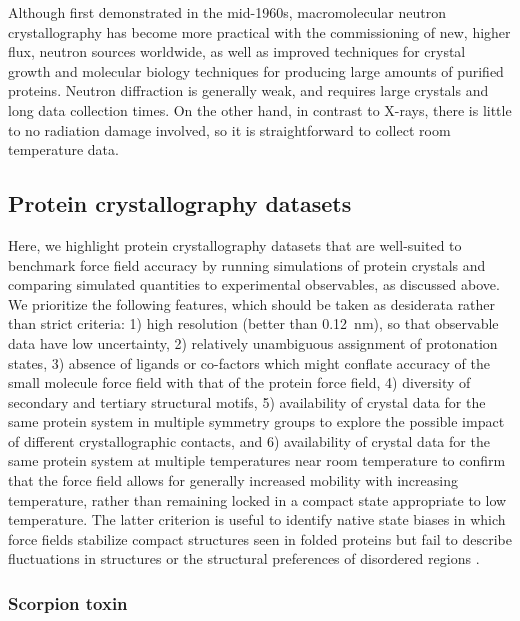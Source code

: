 \documentclass[9pt,review]{livecoms}
\begin{document}
Although first demonstrated in the mid-1960s, macromolecular neutron crystallography has become more practical with the commissioning of new, higher flux, neutron sources worldwide, as well as improved techniques for crystal growth and molecular biology techniques for producing large amounts of purified proteins.
Neutron diffraction is generally weak, and requires large crystals and long data collection times.
On the other hand, in contrast to X-rays, there is little to no radiation damage involved, so it is straightforward to collect room temperature data.

\subsection{Protein crystallography datasets}
\label{sub:xtal_data}

Here, we highlight protein crystallography datasets that are well-suited to benchmark force field accuracy by running simulations of protein crystals and comparing simulated quantities to experimental observables, as discussed above.
We prioritize the following features, which should be taken as desiderata rather than strict criteria: 1) high resolution (better than \qty{0.12}{\nano\meter}), so that observable data have low uncertainty, 2) relatively unambiguous assignment of protonation states, 3) absence of ligands or co-factors which might conflate accuracy of the small molecule force field with that of the protein force field, 4) diversity of secondary and tertiary structural motifs, 5) availability of crystal data for the same protein system in multiple symmetry groups to explore the possible impact of different crystallographic contacts, and 6) availability of crystal data for the same protein system at multiple temperatures near room temperature to confirm that the force field allows for generally increased mobility with increasing temperature, rather than remaining locked in a compact state appropriate to low temperature.
The latter criterion is useful to identify native state biases in which force fields stabilize compact structures seen in folded proteins but fail to describe fluctuations in structures or the structural preferences of disordered regions \cite{best_are_2008}.

\subsubsection{Scorpion toxin}
\label{sub2:scorption_toxin}
\end{document}
